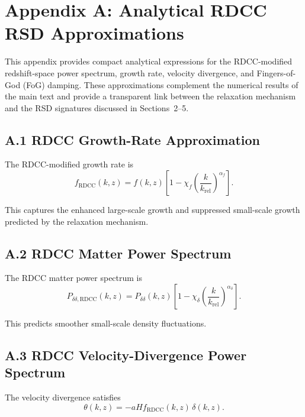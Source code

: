 \documentclass[11pt,a4paper]{article}
\begin{document}
\section*{Appendix A: Analytical RDCC RSD Approximations}

This appendix provides compact analytical expressions for the RDCC-modified redshift-space
power spectrum, growth rate, velocity divergence, and Fingers-of-God (FoG) damping. These
approximations complement the numerical results of the main text and provide a transparent
link between the relaxation mechanism and the RSD signatures discussed in Sections~2–5.

\subsection*{A.1 RDCC Growth-Rate Approximation}

The RDCC-modified growth rate is
\begin{equation}
f_{\mathrm{RDCC}}(k,z)
=
f(k,z)
\left[
1
-
\chi_{f}
\left(
\frac{k}{k_{\mathrm{rel}}}
\right)^{\alpha_{f}}
\right].
\end{equation}

This captures the enhanced large-scale growth and suppressed small-scale growth predicted by
the relaxation mechanism.

\subsection*{A.2 RDCC Matter Power Spectrum}

The RDCC matter power spectrum is
\begin{equation}
P_{\delta\delta,\mathrm{RDCC}}(k,z)
=
P_{\delta\delta}(k,z)
\left[
1
-
\chi_{\delta}
\left(
\frac{k}{k_{\mathrm{rel}}}
\right)^{\alpha_{\delta}}
\right].
\end{equation}

This predicts smoother small-scale density fluctuations.

\subsection*{A.3 RDCC Velocity-Divergence Power Spectrum}

The velocity divergence satisfies
\begin{equation}
\theta(k,z) = -aHf_{\mathrm{RDCC}}(k,z)\,\delta(k,z).
\end{equation}
\end{document}
